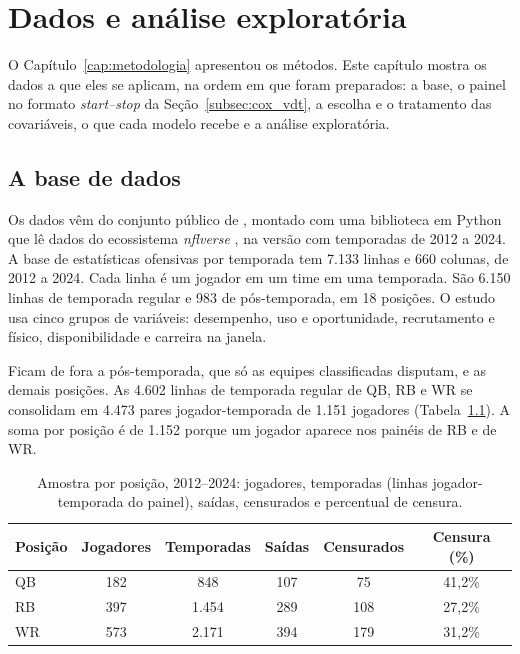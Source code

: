 
\chapter{Dados e análise exploratória}
\label{cap:material}
\raggedbottom

O Capítulo~\ref{cap:metodologia} apresentou os métodos. Este capítulo mostra os dados a que eles se aplicam, na ordem em que foram preparados: a base, o painel no formato \textit{start--stop} da Seção~\ref{subsec:cox_vdt}, a escolha e o tratamento das covariáveis, o que cada modelo recebe e a análise exploratória.

\section{A base de dados}
\label{sec:contexto}

Os dados vêm do conjunto público de \citet{hyde_nflstats}, montado com uma biblioteca em Python \citep{nfldatapy} que lê dados do ecossistema \textit{nflverse} \citep{nflverse}, na versão com temporadas de 2012 a 2024. A base de estatísticas ofensivas por temporada tem 7.133 linhas e 660 colunas, de 2012 a 2024. Cada linha é um jogador em um time em uma temporada. São 6.150 linhas de temporada regular e 983 de pós-temporada, em 18 posições. O estudo usa cinco grupos de variáveis: desempenho, uso e oportunidade, recrutamento e físico, disponibilidade e carreira na janela.

Ficam de fora a pós-temporada, que só as equipes classificadas disputam, e as demais posições. As 4.602 linhas de temporada regular de QB, RB e WR se consolidam em 4.473 pares jogador-temporada de 1.151 jogadores (Tabela~\ref{tab:amostra}). A soma por posição é de 1.152 porque um jogador aparece nos painéis de RB e de WR.

\begin{table}[H]
\centering
\caption{Amostra por posição, 2012--2024: jogadores, temporadas (linhas jogador-temporada do painel), saídas, censurados e percentual de censura.}
\label{tab:amostra}
\thesistablesetup
\begin{tabular*}{\textwidth}{@{\extracolsep{\fill}}lccccc@{}}
\toprule
\textbf{Posição} & \textbf{Jogadores} & \textbf{Temporadas} & \textbf{Saídas} & \textbf{Censurados} & \textbf{Censura (\%)} \\
\midrule
QB  & 182 & 848  & 107 & 75  & 41{,}2\% \\
RB  & 397 & 1.454 & 289 & 108 & 27{,}2\% \\
WR  & 573 & 2.171 & 394 & 179 & 31{,}2\% \\
\bottomrule
\end{tabular*}
\end{table}

